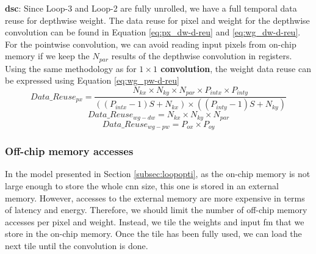 \textbf{\acrshort{dsc}}: Since Loop-3 and Loop-2 are fully unrolled, we have a full temporal data reuse for depthwise weight. The data reuse for pixel and weight for the depthwise convolution can be found in Equation \eqref{eq:px_dw-d-reu} \cite{ma_optimizing_2018} and \eqref{eq:wg_dw-d-reu}. For the pointwise convolution, we can avoid reading input pixels from on-chip memory if we keep the $N_{par}$ results of the depthwise convolution in registers.
Using the same methodology as for \textbf{$1 \times 1$ convolution}, the weight data reuse can be expressed using Equation \eqref{eq:wg_pw-d-reu}
%
\begin{equation}
    Data\_Reuse_{px} = \frac{N_{kx} \times N_{ky} \times N_{par} \times P_{intx} \times P_{inty}}{\left( \left( P_{intx} - 1 \right)S + N_{kx} \right) \times \left( \left( P_{inty} - 1 \right)S + N_{ky} \right)}
    \label{eq:px_dw-d-reu}
\end{equation}
\begin{equation}
    Data\_Reuse_{wg-dw} = N_{kx} \times N_{ky} \times N_{par}
    \label{eq:wg_dw-d-reu}
\end{equation}
\begin{equation}
    Data\_Reuse_{wg-pw} = P_{ox} \times P_{oy}
    \label{eq:wg_pw-d-reu}
\end{equation}
%
\subsubsection{Off-chip memory accesses}
%
In the model presented in Section \ref{subsec:loopopti}, as the on-chip memory is not large enough to store the whole \acrshort{cnn} size, this one is stored in an external memory. However, accesses to the external memory are more expensive in terms of latency and energy. Therefore, we should limit the number of off-chip memory accesses per pixel and weight. Instead, we tile the weights and input \acrshort{fm} that we store in the on-chip memory. Once the tile has been fully used, we can load the next tile until the convolution is done.

